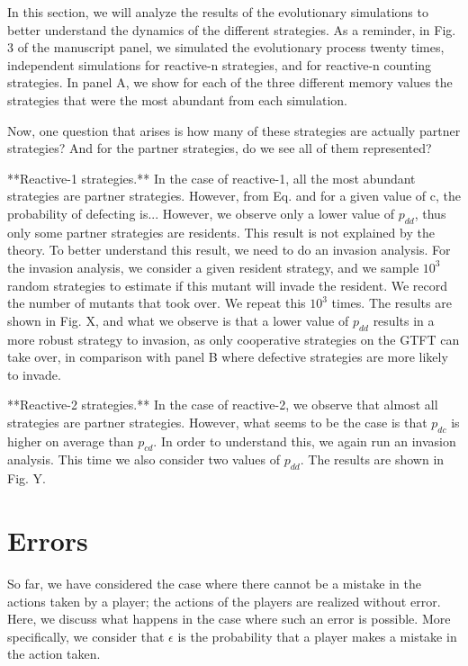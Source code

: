 \documentclass[11pt]{article}
\theoremstyle{plainCl1}
\theoremstyle{plainCl2}
\begin{document}
In this section, we will analyze the results of the evolutionary simulations to
better understand the dynamics of the different strategies. As a reminder, in
Fig. 3 of the manuscript panel, we simulated the evolutionary process twenty
times, independent simulations for reactive-n strategies, and for reactive-n
counting strategies. In panel A, we show for each of the three different memory
values the strategies that were the most abundant from each simulation.

Now, one question that arises is how many of these strategies are actually
partner strategies? And for the partner strategies, do we see all of them
represented?

**Reactive-1 strategies.** In the case of reactive-1, all the most abundant
strategies are partner strategies. However, from Eq. and for a given value of c,
the probability of defecting is... However, we observe only a lower value of \(
p_{dd} \), thus only some partner strategies are residents. This result is not
explained by the theory. To better understand this result, we need to do an
invasion analysis. For the invasion analysis, we consider a given resident
strategy, and we sample \( 10^3 \) random strategies to estimate if this mutant
will invade the resident. We record the number of mutants that took over. We
repeat this \( 10^3 \) times. The results are shown in Fig. X, and what we
observe is that a lower value of \( p_{dd} \) results in a more robust strategy
to invasion, as only cooperative strategies on the GTFT can take over, in
comparison with panel B where defective strategies are more likely to invade.

**Reactive-2 strategies.** In the case of reactive-2, we observe that almost all
strategies are partner strategies. However, what seems to be the case is that \(
p_{dc} \) is higher on average than \( p_{cd} \). In order to understand this,
we again run an invasion analysis. This time we also consider two values of \(
p_{dd} \). The results are shown in Fig. Y.



\section{Errors}

So far, we have considered the case where there cannot be a mistake in the
actions taken by a player; the actions of the players are realized without
error. Here, we discuss what happens in the case where such an error is
possible. More specifically, we consider that \(\epsilon\) is the probability
that a player makes a mistake in the action taken.
\end{document}

